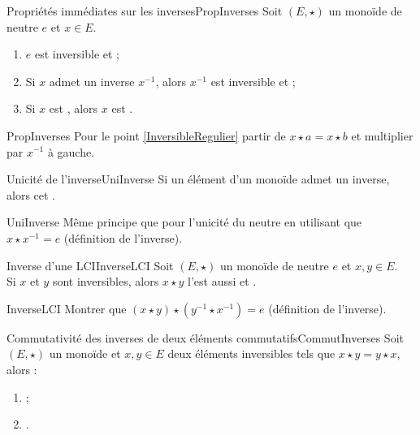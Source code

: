 \documentclass[12pt,a4paper]{report}
\begin{document}
    \begin{propositions}{Propriétés immédiates sur les inverses}{PropInverses}
    Soit $(E, \star)$ un monoïde de neutre $e$ et $x \in E$.
    \begin{enumerate}[label=\bfseries\arabic*)]
        \item $e$ est inversible et  ;
        \item Si $x$ admet un inverse $x^{-1}$, alors $x^{-1}$ est inversible et  ;
        \item\label{InversibleRegulier} Si $x$ est , alors $x$ est .
    \end{enumerate}
    \end{propositions}
    
    \begin{principedemo}{PropInverses}
    Pour le point \ref{InversibleRegulier} partir de $x \star a = x \star b$ et multiplier par $x^{-1}$ à gauche.
    \end{principedemo}
    
    \begin{proposition}{Unicité de l'inverse}{UniInverse}
    Si un élément d'un monoïde admet un inverse, alors cet .
    \end{proposition}
    
    \begin{principedemo}{UniInverse}
    Même principe que pour l'unicité du neutre en utilisant que $x \star x^{-1} = e$ (définition de l'inverse).
    \end{principedemo}
    
    \begin{proposition}{Inverse d'une LCI}{InverseLCI}
    Soit $(E, \star)$ un monoïde de neutre $e$ et $x, y \in E$.\\
    Si $x$ et $y$ sont inversibles, alors $x \star y$ l'est aussi et . 
    \end{proposition}
    
    \begin{principedemo}{InverseLCI}
    Montrer que $(x \star y) \star \left(y^{-1} \star x^{-1} \right) = e$ (définition de l'inverse).
    \end{principedemo}
    
    \begin{proposition}{Commutativité des inverses de deux éléments commutatifs}{CommutInverses}
    Soit $(E, \star)$ un monoïde et $x, y \in E$ deux éléments inversibles tels que $x \star y = y \star x$, alors :
    \begin{multicols}{2}
    \begin{enumerate}[label=\bfseries\arabic*)]
        \item\label{PropInvCom1}  ;
        \item\label{PropInvCom2} .
    \end{enumerate}
    \end{multicols}
    \smallskip
    \end{proposition}
    
\end{document}
